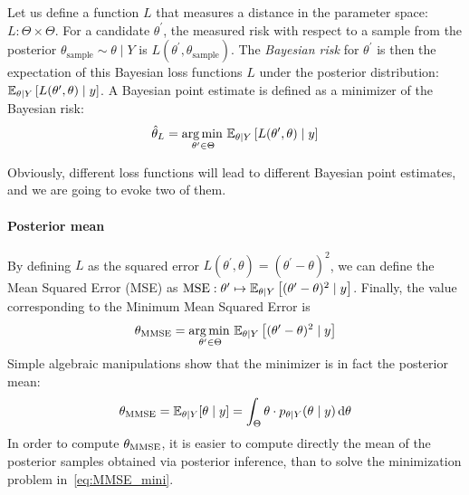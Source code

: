 \documentclass[../../Main_ManuscritThese.tex]{subfiles}
\begin{document}
Let us define a function $L$ that measures a distance in the parameter space: $L:\Theta\times \Theta$. For a candidate $\theta^{\prime}$, the measured risk with respect to a sample from the posterior $\theta_{\mathrm{sample}} \sim \theta \mid Y$ is $L(\theta^{\prime}, \theta_{\mathrm{sample}})$.
The \emph{Bayesian risk} for $\theta^{\prime}$ is then the expectation of this Bayesian loss functions $L$ under the posterior distribution: $\mathbb{E}_{\theta\mid Y}\left[L(\theta^{\prime},\theta)\mid y\right]$. A Bayesian point estimate is defined as a minimizer of the Bayesian risk:
\begin{equation}
  \hat{\theta}_{L} = \operatorname*{arg\,min \,}_{\theta^{\prime} \in \Theta} \mathbb{E}_{\theta\mid Y}\left[L(\theta^{\prime}, \theta) \mid y\right]
\end{equation}

Obviously, different loss functions will lead to different Bayesian point estimates, and we are going to evoke two of them.
\paragraph{Posterior mean}
By defining $L$ as the squared error $L(\theta^{\prime}, \theta) = (\theta^{\prime} - \theta)^2$, we can define the Mean Squared Error (MSE) as $\mathrm{MSE}: \theta^{\prime}\mapsto\mathbb{E}_{\theta\mid Y}\left[(\theta^{\prime} - \theta)^2 \mid y\right]$. Finally, the value corresponding to the Minimum Mean Squared Error is
\begin{equation}
  \label{eq:MMSE_mini}
  {\theta}_{\mathrm{MMSE}} = \operatorname*{arg\,min \,}_{\theta^{\prime}\in\Theta}\mathbb{E}_{\theta\mid Y}\left[(\theta^{\prime} - \theta)^2 \mid  y\right]
\end{equation}
Simple algebraic manipulations show that the minimizer is in fact the posterior mean:
\begin{equation}
  \label{eq:def_MMSE}
  {\theta}_{\mathrm{MMSE}} = \mathbb{E}_{\theta\mid Y}[\theta \mid  y] = \int_{\Theta}\theta\cdot p_{\theta\mid Y}(\theta \mid  y)\,\mathrm{d}\theta
\end{equation}
In order to compute ${\theta}_{\mathrm{MMSE}}$, it is easier to compute directly the mean of the posterior samples obtained via posterior inference, than to solve the minimization problem in~\cref{eq:MMSE_mini}.
\end{document}
